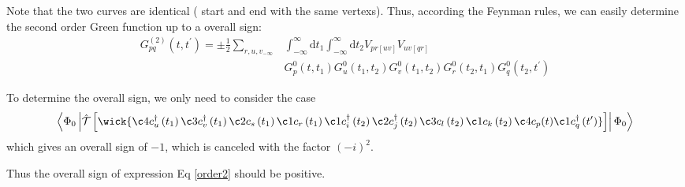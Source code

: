 Note that the two curves are identical ( start and end with the same vertexs).
Thus, according the Feynman rules, we can easily determine the second order Green function up to a overall sign:
\begin{equation} \label{order2}
	\begin{aligned} 
	G_{p q}^{(2)}\left(t, t^{\prime}\right)=\pm \frac{1}{2} \sum_{r, u, v_{-\infty}} & \int_{-\infty}^{\infty} \mathrm{d} t_{1} \int_{-\infty}^{\infty} \mathrm{d} t_{2} V_{p r[u v]} V_{u v[q r]} 
	\\ 
	& G_{p}^{0}\left(t, t_{1}\right) G_{u}^{0}\left(t_{1}, t_{2}\right) G_{v}^{0}\left(t_{1}, t_{2}\right) G_{r}^{0}\left(t_{2}, t_{1}\right) G_{q}^{0}\left(t_{2}, t^{\prime}\right) 
	\end{aligned}
\end{equation}

To determine the overall sign, we only need to consider the case
\begin{equation}
	\left\langle\Phi_{0}\left|
	\hat{\mathcal{T}}\left[
		\wick{\c4 c_{u}^{\dagger}\left(t_{1}\right) \c3 c_{v}^{\dagger}\left(t_{1}\right) \c2 c_{s}\left(t_{1}\right) \c1 c_{r}\left(t_{1}\right) \c1 c_{i}^{\dagger}\left(t_{2}\right) \c2 c_{j}^{\dagger}\left(t_{2}\right) \c3 c_{l}\left(t_{2}\right) \c1 c_{k}\left(t_{2}\right) \c4 c_{p}(t) \c1 c_{q}^{\dagger}\left(t^{\prime}\right)}
		\right]
		\right| \Phi_{0}\right\rangle
\end{equation}
which gives an overall sign of $-1$, which is canceled with the factor $(-i)^2$.

Thus the overall sign of expression Eq \ref{order2} should be positive.


